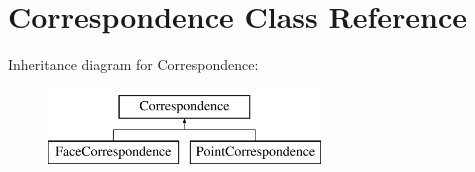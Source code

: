 \hypertarget{class_correspondence}{}\section{Correspondence Class Reference}
\label{class_correspondence}
Inheritance diagram for Correspondence\+:\begin{figure}[H]
\begin{center}
\leavevmode
\includegraphics[height=2.000000cm]{class_correspondence}
\end{center}
\end{figure}
